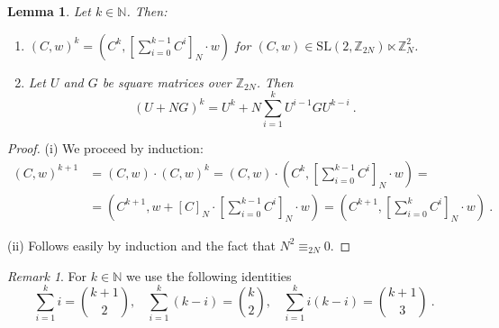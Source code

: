 \documentclass[10pt]{amsart}
\theoremstyle{plain}
\newtheorem{lemma}[theorem]{Lemma}
\theoremstyle{definition}
\theoremstyle{remark}%
\newtheorem{remark}[theorem]{Remark}
\newcommand{\N}{\mathbb{N}}
\newcommand{\Z}{\mathbb{Z}}
\newcommand{\SL}{\mathrm{SL}}
\begin{document}
\begin{lemma}\label{basic}
Let $k\in\N$. Then:
\begin{enumerate}
\item[(i)] $(C,w)^k=\left(C^k,\left[\sum_{i=0}^{k-1}C^i\right]_N\cdot w\right)$ for $(C,w)\in \SL(2,\Z_{2N})\ltimes \Z_{N}^2$.
\item[(ii)] Let $U$ and $G$ be square matrices over $\Z_{2N}$. Then 
$$(U+N G)^k=U^k+N\sum\limits^{k}_{i=1}U^{i-1}GU^{k-i}\ .$$
\end{enumerate}
\end{lemma}
\begin{proof}
 (i) We proceed by induction:  
 \begin{align*}
 (C,w)^{k+1}&=(C,w)\cdot(C,w)^k=(C,w)\cdot\left(C^k,\left[\sum_{i=0}^{k-1}C^i\right]_N\cdot w\right)=\\
 &=\left(C^{k+1},w+[C]_N\cdot\left[\sum_{i=0}^{k-1}C^i\right]_N\cdot w\right)=\left(C^{k+1},\left[\sum_{i=0}^{k}C^i\right]_N\cdot w\right)\ .
 \end{align*}

 (ii) Follows easily by induction and the fact that $N^{2}\equiv_{2N}0$.
\end{proof}

\begin{remark}\label{7.2}
 For $k\in\N$ we use the following identities  $$\sum_{i=1}^k i={k+1\choose 2}, \ \ \ \ \sum_{i=1}^k (k-i)={k\choose 2}, \ \ \ \ \sum_{i=1}^k i(k-i)={k+1\choose 3}\ .$$
\end{remark}
\end{document}
